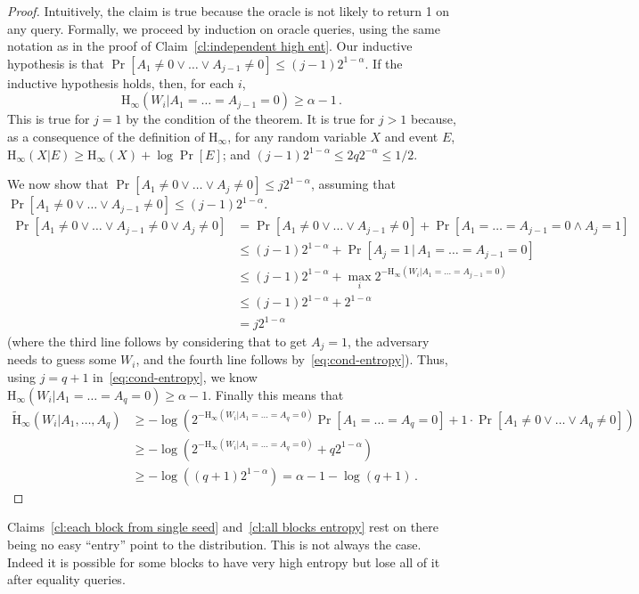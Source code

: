 \documentclass[11pt]{article}
\newcommand{\clref}[1]{\mbox{Claim~\ref{#1}}}
\newcommand{\Hoo}{\mathrm{H}_\infty}
\newcommand{\Hav}{\tilde{\mathrm{H}}_\infty}
\begin{document}
\begin{proof}
Intuitively, the claim is true because the oracle is not likely to return 1 on any query. Formally, we proceed by induction on oracle queries,
using the same notation as in the proof of   \clref{cl:independent high ent}. Our inductive hypothesis is
that $\Pr[A_1\neq 0 \vee \dots \vee A_{j-1}\neq 0] \leq (j-1)2^{1-\alpha}$.  If the inductive hypothesis holds, then, for each $i$,
\begin{equation}
\label{eq:cond-entropy}
\Hoo(W_i | A_1= \dots= A_{j-1}=0) \ge \alpha-1\,.
\end{equation}
This is true for $j=1$ by the condition of the theorem. It is true for $j>1$ because, as a consequence of the definition of $\Hoo$,
for any random variable $X$ and event $E$, $\Hoo(X|E)\ge \Hoo(X)+\log\Pr[E]$; and $(j-1) 2^{1-\alpha}\leq 2 q 2^{-\alpha} \leq 1/2$.

We now show that $\Pr[A_1\neq 0 \vee \dots \vee A_{j}\neq 0] \leq j2^{1-\alpha}$, assuming that $\Pr[A_1\neq 0 \vee \dots \vee A_{j-1}\neq 0] \leq (j-1)2^{1-\alpha}$.
\begin{align*}
\Pr[A_1\neq 0 \vee \dots \vee A_{j-1}\neq 0 \vee A_j\neq 0] & =
\Pr[A_1\neq 0 \vee \dots \vee A_{j-1}\neq 0]+\Pr[A_1=\dots = A_{j-1}=0 \wedge A_j=1]\\
& \le  (j-1)2^{1-\alpha}+\Pr[A_j=1\,|\,A_1=\dots = A_{j-1}=0]\\
& \le  (j-1)2^{1-\alpha}+\max_i 2^{-\Hoo(W_i | A_1=\dots =A_{j-1}=0)}\\
& \le  (j-1)2^{1-\alpha}+ 2^{1-\alpha}\\
& = j 2^{1-\alpha}
\end{align*}
(where the third line follows by considering that to get $A_j=1$, the adversary needs to guess some $W_i$, and the fourth line follows by~\eqref{eq:cond-entropy}).
Thus, using $j=q+1$ in~\eqref{eq:cond-entropy},
 we know $\Hoo(W_i | A_1= \dots= A_q=0) \ge \alpha-1$.  Finally this means that
\begin{align*}
\Hav(W_i | A_1,\dots, A_q) &\ge -\log \left( 2^{-\Hoo(W_i | A_1= \dots= A_q=0)}\Pr[A_1=\dots=A_q=0]+1\cdot \Pr[A_1\neq 0 \vee \dots \vee  A_q\neq 0] \right)\\
& \ge -\log \left(  2^{-\Hoo(W_i | A_1= \dots= A_q=0)}+q2^{1-\alpha} \right)\\
& \ge -\log \left(  (q+1) 2^{1-\alpha}\right) = \alpha-1-\log(q+1)\,.
\end{align*}
\end{proof}

Claims~\ref{cl:each block from single seed} and~\ref{cl:all blocks entropy} rest on there being no easy ``entry'' point to the distribution.  This is not always the case.  Indeed it is possible for some blocks to have very high entropy but lose all of it after equality queries.
\end{document}
